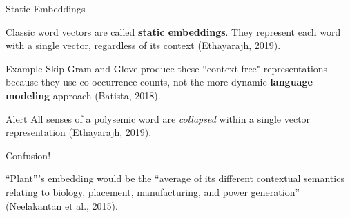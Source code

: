 \begin{frame}{Static Embeddings}

\normalsize 

\begin{itemizeSpaced}{5pt}
    \pinkbox Classic word vectors are called \textbf{static embeddings}. They represent each word with a single vector, regardless of its context (Ethayarajh, 2019). 
    
    
    
    \begin{exampleBlock}{Example}
        Skip-Gram and Glove produce these ``context-free" representations because they use co-occurrence counts, not the more dynamic \textbf{language modeling} approach (Batista, 2018). 
    \end{exampleBlock}
    
    \begin{alertBlock}{Alert}
        All senses of a polysemic word are \emph{collapsed} within a single vector representation (Ethayarajh, 2019). 
        
        Confusion!
        
        ``Plant”'s embedding would be the ``average of its different contextual semantics relating to biology, placement, manufacturing, and power generation” (Neelakantan et al., 2015).

    
    \end{alertBlock}
      
\end{itemizeSpaced}
    
\end{frame}




